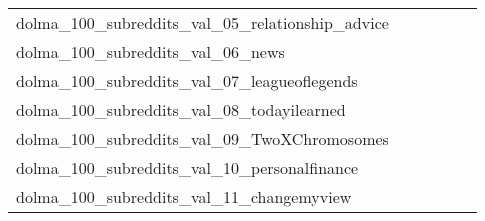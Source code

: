 {\begin{longtable}{m{6cm}m{1.7cm}m{1.7cm}m{1.7cm}m{1.7cm}m{1.7cm}}
	dolma\_100\_subreddits\_val\_05\_relationship\_advice  & \colorbox[HTML]{ffffe5}{\makebox[\mywidth][c]{19.40}} & \colorbox[HTML]{afdd8f}{\makebox[\mywidth][c]{18.53}} & \colorbox[HTML]{ffffe5}{\makebox[\mywidth][c]{19.68}} & \colorbox[HTML]{def2a6}{\makebox[\mywidth][c]{18.63}} & \colorbox[HTML]{77c578}{\makebox[\mywidth][c]{18.46}}\\
	dolma\_100\_subreddits\_val\_06\_news  & \colorbox[HTML]{ffffe5}{\makebox[\mywidth][c]{22.49}} & \colorbox[HTML]{b0de8f}{\makebox[\mywidth][c]{21.25}} & \colorbox[HTML]{ffffe5}{\makebox[\mywidth][c]{22.51}} & \colorbox[HTML]{f6fbb8}{\makebox[\mywidth][c]{21.49}} & \colorbox[HTML]{77c578}{\makebox[\mywidth][c]{21.17}}\\
	dolma\_100\_subreddits\_val\_07\_leagueoflegends  & \colorbox[HTML]{ffffe5}{\makebox[\mywidth][c]{34.45}} & \colorbox[HTML]{d4eea0}{\makebox[\mywidth][c]{32.41}} & \colorbox[HTML]{ffffe5}{\makebox[\mywidth][c]{35.13}} & \colorbox[HTML]{dbf1a4}{\makebox[\mywidth][c]{32.46}} & \colorbox[HTML]{77c578}{\makebox[\mywidth][c]{32.04}}\\
	dolma\_100\_subreddits\_val\_08\_todayilearned  & \colorbox[HTML]{ffffe5}{\makebox[\mywidth][c]{22.53}} & \colorbox[HTML]{d8efa2}{\makebox[\mywidth][c]{21.30}} & \colorbox[HTML]{ffffe5}{\makebox[\mywidth][c]{22.68}} & \colorbox[HTML]{ceeb9e}{\makebox[\mywidth][c]{21.28}} & \colorbox[HTML]{77c578}{\makebox[\mywidth][c]{21.10}}\\
	dolma\_100\_subreddits\_val\_09\_TwoXChromosomes  & \colorbox[HTML]{ffffe5}{\makebox[\mywidth][c]{20.20}} & \colorbox[HTML]{ceeb9e}{\makebox[\mywidth][c]{19.16}} & \colorbox[HTML]{ffffe5}{\makebox[\mywidth][c]{20.25}} & \colorbox[HTML]{dff2a7}{\makebox[\mywidth][c]{19.20}} & \colorbox[HTML]{77c578}{\makebox[\mywidth][c]{19.02}}\\
	dolma\_100\_subreddits\_val\_10\_personalfinance  & \colorbox[HTML]{ffffe5}{\makebox[\mywidth][c]{18.62}} & \colorbox[HTML]{7fc97b}{\makebox[\mywidth][c]{17.65}} & \colorbox[HTML]{ffffe5}{\makebox[\mywidth][c]{18.82}} & \colorbox[HTML]{b7e193}{\makebox[\mywidth][c]{17.73}} & \colorbox[HTML]{77c578}{\makebox[\mywidth][c]{17.64}}\\
	dolma\_100\_subreddits\_val\_11\_changemyview  & \colorbox[HTML]{ffffe5}{\makebox[\mywidth][c]{20.02}} & \colorbox[HTML]{bbe395}{\makebox[\mywidth][c]{19.10}} & \colorbox[HTML]{ffffe5}{\makebox[\mywidth][c]{20.50}} & \colorbox[HTML]{d5eea1}{\makebox[\mywidth][c]{19.17}} & \colorbox[HTML]{77c578}{\makebox[\mywidth][c]{18.99}}\\

\end{longtable}}

